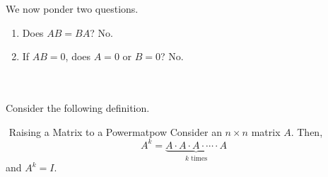         We now ponder two questions.
        \begin{enumerate}
            \item Does \(AB=BA\)? No.
            \item If \(AB=0\), does \(A=0\) or \(B=0\)? No.
        \end{enumerate}
        \vphantom
        \\
        \\
        Consider the following definition.
        \begin{definition}{\Stop\,\,Raising a Matrix to a Power}{matpow}
            Consider an \(n\times n\) matrix \(A\). Then,
            \begin{equation*}
                A^k=\underbrace{A\cdot A\cdot A\cdot\cdots\cdot A}_{k \text{ times}}
            \end{equation*}
            and \(A^k=I\).
        \end{definition}
        
        